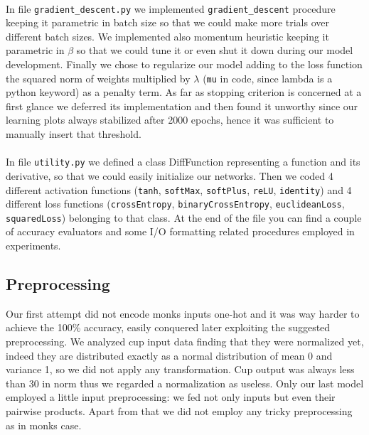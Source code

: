 \paragraph{}
In file \texttt{gradient\_descent.py} we implemented \texttt{gradient\_descent} procedure keeping it parametric in batch size so that we could make more trials over different batch sizes. We implemented also momentum heuristic keeping it parametric in $\beta$ so that we could tune it or even shut it down during our model development.
Finally we chose to regularize our model adding to the loss function the squared norm of weights multiplied by $\lambda$ (\texttt{mu} in code, since lambda is a python keyword) as a penalty term. As far as stopping criterion is concerned at a first glance we deferred its implementation and then found it unworthy since our learning plots always stabilized after 2000 epochs, hence it was sufficient to manually insert that threshold.

\paragraph{}
In file \texttt{utility.py} we defined a class DiffFunction representing a function and its derivative, so that we could easily initialize our networks. Then we coded 4 different activation functions (\texttt{tanh}, \texttt{softMax}, \texttt{softPlus}, \texttt{reLU}, \texttt{identity}) and 4 different loss functions (\texttt{crossEntropy}, \texttt{binaryCrossEntropy}, \texttt{euclideanLoss}, \texttt{squaredLoss}) belonging to that class. At the end of the file you can find a couple of accuracy evaluators and some I/O formatting related procedures employed in experiments.

\subsection{Preprocessing}

Our first attempt did not encode monks inputs one-hot and it was way harder to achieve the 100\% accuracy, easily conquered later exploiting the suggested preprocessing. We analyzed cup input data finding that they were normalized yet, indeed they are distributed exactly as a normal distribution of mean 0 and variance 1, so we did not apply any transformation. Cup output was always less than 30 in norm thus we regarded a normalization as useless. Only our last model employed a little input preprocessing: we fed not only inputs but even their pairwise products. Apart from that we did not employ any tricky preprocessing as in monks case.

